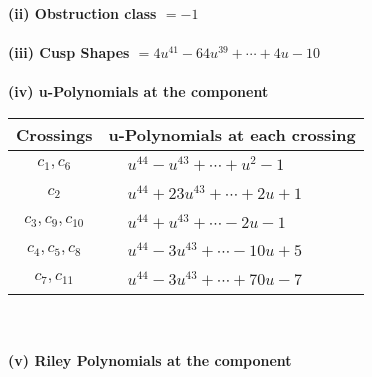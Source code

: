 \documentclass[1p]{elsarticle_modified}
\theoremstyle{definition}
\begin{document}
\flushleft \textbf{(ii) Obstruction class $= -1$}\\~\\
\flushleft \textbf{(iii) Cusp Shapes $= 4 u^{41}-64 u^{39}+\cdots+4 u-10$}\\~\\
\newpage\renewcommand{\arraystretch}{1}
\flushleft \textbf{(iv) u-Polynomials at the component}\newline \\
\begin{tabular}{m{50pt}|m{274pt}}
Crossings & \hspace{64pt}u-Polynomials at each crossing \\
\hline $$\begin{aligned}c_{1},c_{6}\end{aligned}$$&$\begin{aligned}
&u^{44}- u^{43}+\cdots+u^2-1
\end{aligned}$\\
\hline $$\begin{aligned}c_{2}\end{aligned}$$&$\begin{aligned}
&u^{44}+23 u^{43}+\cdots+2 u+1
\end{aligned}$\\
\hline $$\begin{aligned}c_{3},c_{9},c_{10}\end{aligned}$$&$\begin{aligned}
&u^{44}+u^{43}+\cdots-2 u-1
\end{aligned}$\\
\hline $$\begin{aligned}c_{4},c_{5},c_{8}\end{aligned}$$&$\begin{aligned}
&u^{44}-3 u^{43}+\cdots-10 u+5
\end{aligned}$\\
\hline $$\begin{aligned}c_{7},c_{11}\end{aligned}$$&$\begin{aligned}
&u^{44}-3 u^{43}+\cdots+70 u-7
\end{aligned}$\\
\hline
\end{tabular}\\~\\
\newpage\renewcommand{\arraystretch}{1}
\flushleft \textbf{(v) Riley Polynomials at the component}\newline \\
\end{document}

